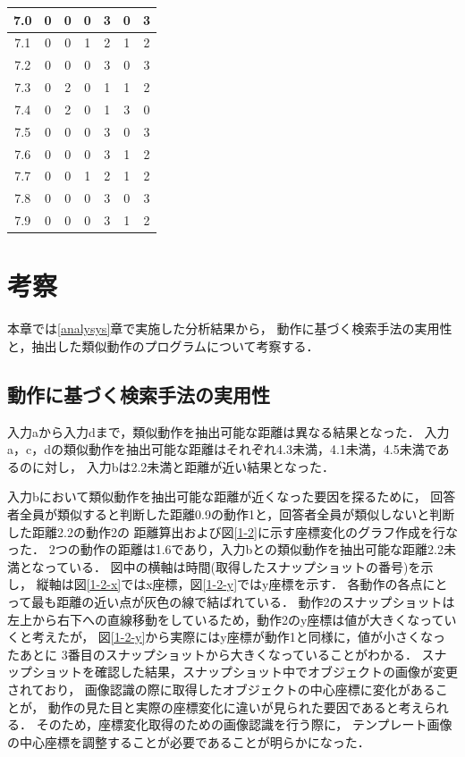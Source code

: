 \documentclass[11pt]{jreport}
\begin{document}
\begin{table}
{\begin{tabular}{c|c|c|c|c|c|c}
    \hline
    7.0 & 0 & 0 & 0 & 3 & 0 & 3 \\
    \hline
    7.1 & 0 & 0 & 1 & 2 & 1 & 2 \\
    \hline
    7.2 & 0 & 0 & 0 & 3 & 0 & 3 \\
    \hline
    7.3 & 0 & 2 & 0 & 1 & 1 & 2 \\
    \hline
    7.4 & 0 & 2 & 0 & 1 & 3 & 0 \\
    \hline
    7.5 & 0 & 0 & 0 & 3 & 0 & 3 \\
    \hline
    7.6 & 0 & 0 & 0 & 3 & 1 & 2 \\
    \hline
    7.7 & 0 & 0 & 1 & 2 & 1 & 2 \\
    \hline
    7.8 & 0 & 0 & 0 & 3 & 0 & 3 \\
    \hline
    7.9 & 0 & 0 & 0 & 3 & 1 & 2 \\
    \hline
    \end{tabular}
    }
\end{table}       


\chapter{考察}
本章では\ref{analysys}章で実施した分析結果から，
動作に基づく検索手法の実用性と，抽出した類似動作のプログラムについて考察する．

\section{動作に基づく検索手法の実用性}

入力aから入力dまで，類似動作を抽出可能な距離は異なる結果となった．
入力a，c，dの類似動作を抽出可能な距離はそれぞれ4.3未満，4.1未満，4.5未満であるのに対し，
入力bは2.2未満と距離が近い結果となった．

入力bにおいて類似動作を抽出可能な距離が近くなった要因を探るために，
回答者全員が類似すると判断した距離0.9の動作1と，回答者全員が類似しないと判断した距離2.2の動作2の
距離算出および図\ref{1-2}に示す座標変化のグラフ作成を行なった．
2つの動作の距離は1.6であり，入力bとの類似動作を抽出可能な距離2.2未満となっている．
図中の横軸は時間(取得したスナップショットの番号)を示し，
縦軸は図\ref{1-2-x}ではx座標，図\ref{1-2-y}ではy座標を示す．
各動作の各点にとって最も距離の近い点が灰色の線で結ばれている．
動作2のスナップショットは左上から右下への直線移動をしているため，動作2のy座標は値が大きくなっていくと考えたが，
図\ref{1-2-y}から実際にはy座標が動作1と同様に，値が小さくなったあとに
3番目のスナップショットから大きくなっていることがわかる．
スナップショットを確認した結果，スナップショット中でオブジェクトの画像が変更されており，
画像認識の際に取得したオブジェクトの中心座標に変化があることが，
動作の見た目と実際の座標変化に違いが見られた要因であると考えられる．
そのため，座標変化取得のための画像認識を行う際に，
テンプレート画像の中心座標を調整することが必要であることが明らかになった．
\end{document}
